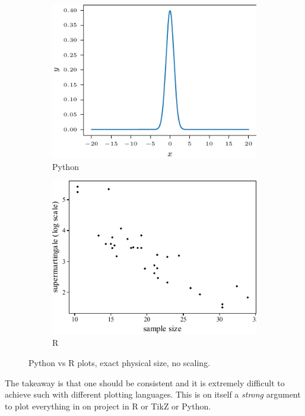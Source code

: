 \documentclass[preprint,aos]{imsart}
\begin{document}
\begin{figure}[htb]
    \centering
    \begin{subfigure}[t]{2.8in}
        \includegraphics{scatterplot-python.pdf}
        \caption{Python}
    \end{subfigure}\hfill
    \begin{subfigure}[t]{2.8in}
        \includegraphics{scatterplot-R.pdf}
        \caption{R}
    \end{subfigure}

    \caption{Python vs R plots, exact physical size, no scaling.}
\end{figure}

The takeaway is that one should be consistent and it is extremely 
difficult to achieve such with different plotting languages.
This is on itself a \emph{strong} argument to plot everything 
in on project in R or TikZ or Python.
\end{document}
